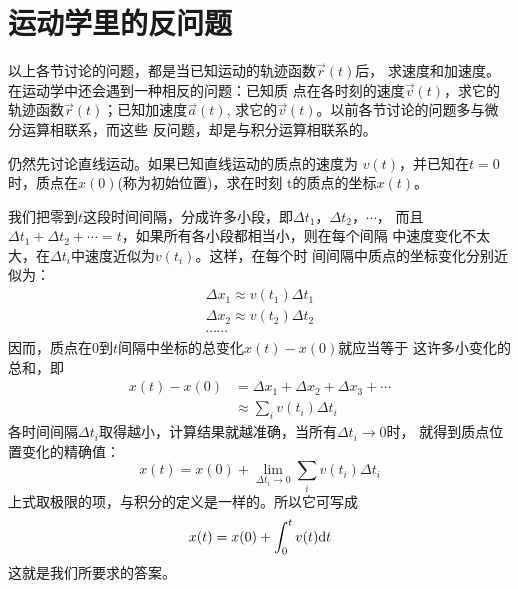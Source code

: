\section{运动学里的反问题}\label{sec:01.11}

    以上各节讨论的问题，都是当已知运动的轨迹函数$\vec{r}(t)$后，
求速度和加速度。在运动学中还会遇到一种相反的问题：已知质
点在各时刻的速度$\vec{v}(t)$，求它的轨迹函数$\vec{r}(t)$；已知加速度$\vec{a}(t)$,
求它的$\vec{v}(t)$。以前各节讨论的问题多与微分运算相联系，而这些
反问题，却是与积分运算相联系的。

    仍然先讨论直线运动。如果已知直线运动的质点的速度为
$v(t)$，并已知在$t=0$时，质点在$x(0)$(称为初始位置)，求在时刻
t的质点的坐标$x(t)$。

    我们把零到$t$这段时间间隔，分成许多小段，即$\Delta t_1$，$\Delta t_2$，$\cdots$，
而且$\Delta t_1+\Delta t_2+\cdots=t$，如果所有各小段都相当小，则在每个间隔
中速度变化不太大，在$\Delta t_i$中速度近似为$v(t_i)$。这样，在每个时
间间隔中质点的坐标变化分别近似为：
\begin{equation*}
    \begin{array}{l}
        \Delta x_{1} \approx v(t_{1}) \Delta t_{1} \\
        \Delta x_{2} \approx v(t_{2}) \Delta t_{2} \\
        \cdots \cdots
    \end{array}
\end{equation*}
因而，质点在0到$t$间隔中坐标的总变化$x(t)-x(0)$就应当等于
这许多小变化的总和，即\vspace{-0.5em}
{\setlength\abovedisplayskip{1pt}
\setlength\belowdisplayskip{1pt}
\begin{equation}\label{eqn:01.11.01}
    \begin{aligned}
        x(t)-x(0) &=\Delta x_{1}+\Delta x_{2}+\Delta x_{3}+\cdots \\
        & \approx \sum_{i} v\left(t_{i}\right) \Delta t_{i}
    \end{aligned}
\end{equation}}\vspace{-0.5em}
各时间间隔$\Delta t_i$取得越小，计算结果就越准确，当所有$\Delta t_i\rightarrow 0$时，
就得到质点位置变化的精确值：
\begin{equation}\label{eqn:01.11.02}
    x(t)=x(0)+\lim _{\Delta t_{i} \rightarrow 0} \sum_{i} v\left(t_{i}\right) \Delta t_{i}
\end{equation}
	上式取极限的项，与积分的定义是一样的。所以它可写成
\begin{equation}\label{eqn:01.11.03}
    x(t)=x(0)+\int_{0}^{t} v(t) {\rm d}  t
\end{equation}
这就是我们所要求的答案。

